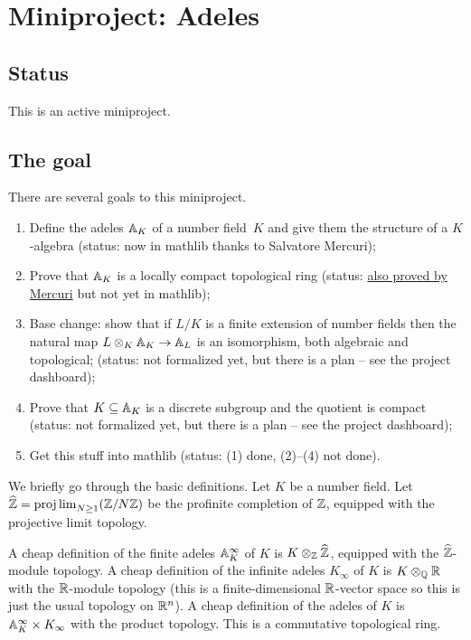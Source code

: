 \chapter{Miniproject: Adeles}\label{Adele_miniproject}

\section{Status}

This is an active miniproject.

\section{The goal}

There are several goals to this miniproject.

\begin{enumerate}
  \item Define the adeles $\mathbb{A}_K$ of a number field~$K$ and
    give them the structure of a $K$-algebra (status: now in mathlib thanks to
    Salvatore Mercuri);
  \item Prove that $\mathbb{A}_K$ is a locally compact topological ring (status:
      \href{https://github.com/smmercuri/adele-ring_locally-compact}{
      also proved by Mercuri} but not yet in mathlib);
  \item Base change: show that if $L/K$ is a finite extension of number fields then the
    natural map $L\otimes_K\mathbb{A}_K\to\mathbb{A}_L$ is an isomorphism, both algebraic and
    topological; (status: not
    formalized yet, but there is a plan -- see the project dashboard);
  \item Prove that $K \subseteq \mathbb{A}_K$ is a discrete subgroup and the quotient
    is compact (status: not formalized yet, but there is a plan -- see the project
    dashboard);
  \item Get this stuff into mathlib (status: (1) done, (2)--(4) not done).
\end{enumerate}

We briefly go through the basic definitions. Let $K$ be a number field.
Let $\widehat{\mathbb{Z}}=\projlim_{N\geq1}(\mathbb{Z}/N\mathbb{Z})$ be the profinite completion of $\mathbb{Z}$,
equipped with the projective limit topology.

A cheap definition of the finite adeles $\mathbb{A}_K^\infty$ of $K$ is $K\otimes_{\mathbb{Z}}\widehat{\mathbb{Z}}$,
equipped with the $\widehat{\mathbb{Z}}$-module topology.
A cheap definition of the infinite adeles
$K_\infty$ of $K$ is $K\otimes_{\mathbb{Q}}\mathbb{R}$ with the $\mathbb{R}$-module topology (this is a
finite-dimensional $\mathbb{R}$-vector space so this is just the usual topology on $\mathbb{R}^n$).
A cheap definition of the adeles of $K$ is $\mathbb{A}_K^\infty\times K_\infty$ with
the product topology. This is a commutative topological ring.

